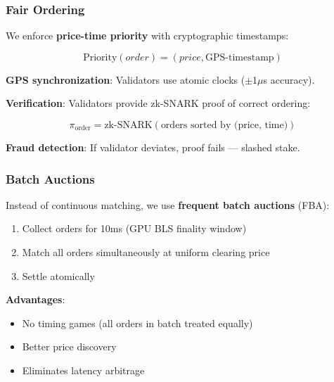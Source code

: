 \subsubsection{Fair Ordering}

We enforce \textbf{price-time priority} with cryptographic timestamps:

\begin{equation}
\text{Priority}(order) = (price, \text{GPS-timestamp})
\end{equation}

\textbf{GPS synchronization}: Validators use atomic clocks ($\pm$1$\mu$s accuracy).

\textbf{Verification}: Validators provide zk-SNARK proof of correct ordering:

\begin{equation}
\pi_{\text{order}} = \text{zk-SNARK}(\text{orders sorted by (price, time)})
\end{equation}

\textbf{Fraud detection}: If validator deviates, proof fails --- slashed stake.

\subsubsection{Batch Auctions}

Instead of continuous matching, we use \textbf{frequent batch auctions} (FBA):

\begin{enumerate}
    \item Collect orders for 10ms (GPU BLS finality window)
    \item Match all orders simultaneously at uniform clearing price
    \item Settle atomically
\end{enumerate}

\textbf{Advantages}:
\begin{itemize}
    \item No timing games (all orders in batch treated equally)
    \item Better price discovery
    \item Eliminates latency arbitrage
\end{itemize}

